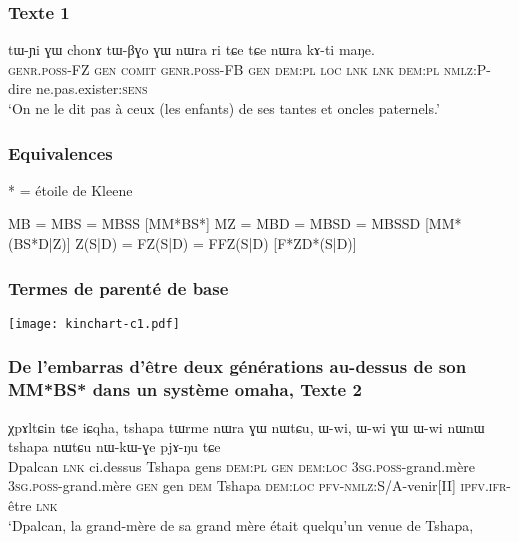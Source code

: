 \documentclass[xcolor=table]{beamer}
\newcommand{\ipa}[1]{{\phon #1}} %
\newcommand{\bleu}[1]{{\color{blue}#1}}
\newcommand{\rouge}[1]{{\color{red}#1}}
\begin{document}
  \begin{frame} 
 \frametitle{Texte 1} 
 \begin{exe}
\ex 
\gll 
\ipa{tɯ-ɲi} 	\ipa{ɣɯ} 	\ipa{chonɤ} 	\ipa{tɯ-βɣo} 	\ipa{ɣɯ} 	\ipa{nɯra} 	\ipa{ri} 	\ipa{tɕe} 	\ipa{tɕe} 	\ipa{nɯra} 	\ipa{kɤ-ti} 	\ipa{maŋe.} 	\\
\textsc{genr.poss}-FZ \textsc{gen} \textsc{comit} \textsc{genr.poss}-FB \textsc{gen} \textsc{dem:pl} \textsc{loc} \textsc{lnk}  \textsc{lnk}  \textsc{dem:pl} \textsc{nmlz:P}-dire  ne.pas.exister:\textsc{sens} \\
\glt `On ne le dit pas à ceux (les enfants) de ses tantes et oncles paternels.'
\end{exe}
\end{frame}

  \begin{frame} 
 \frametitle{Equivalences} 
 * = étoile de Kleene
\begin{exe}
\ex 
\glt MB = MBS = MBSS \bleu{[MM*BS*]} \rouge{\ipa{tɤ-rpɯ}}
\glt MZ = MBD = MBSD = MBSSD \bleu{[MM*(BS*D|Z)]} \rouge{\ipa{tɤ-ɬaʁ}}
\ex 
\glt Z(S|D) = FZ(S|D) = FFZ(S|D) \bleu{[F*ZD*(S|D)]} \rouge{\ipa{tɤ-ftsa}}
\end{exe}
\end{frame}

  \begin{frame} 
 \frametitle{Termes de parenté de base} 
\texttt{[image: kinchart-c1.pdf]}
\end{frame}

  \begin{frame} 
 \frametitle{De l'embarras d'être deux générations au-dessus de son MM*BS* dans un système omaha, Texte 2} 
 \begin{exe}
\ex 
\gll 
\ipa{χpɤltɕin} 	\ipa{tɕe} 	\ipa{iɕqha,} 	\ipa{tshapa} 	\ipa{tɯrme} 	\ipa{nɯra} 	\ipa{ɣɯ} 	\ipa{nɯtɕu,} \ipa{ɯ-wi,} 	\ipa{ɯ-wi} 	\ipa{ɣɯ} 	\ipa{ɯ-wi} 	\ipa{nɯnɯ} 	\ipa{tshapa} 	\ipa{nɯtɕu} 	\ipa{nɯ-kɯ-ɣe} 	\ipa{pjɤ-ŋu} 	\ipa{tɕe}  \\
Dpalcan \textsc{lnk} ci.dessus Tshapa gens  \textsc{dem:pl} \textsc{gen}  \textsc{dem:loc} \textsc{3sg.poss}-grand.mère  \textsc{3sg.poss}-grand.mère  \textsc{gen} gen \textsc{dem} Tshapa \textsc{dem:loc} \textsc{pfv}-\textsc{nmlz}:S/A-venir[II] \textsc{ipfv.ifr}-être \textsc{lnk}  \\
\glt `Dpalcan, la grand-mère de sa grand mère était quelqu'un venue de Tshapa, 
\end{exe}
\end{frame}
\end{document}
